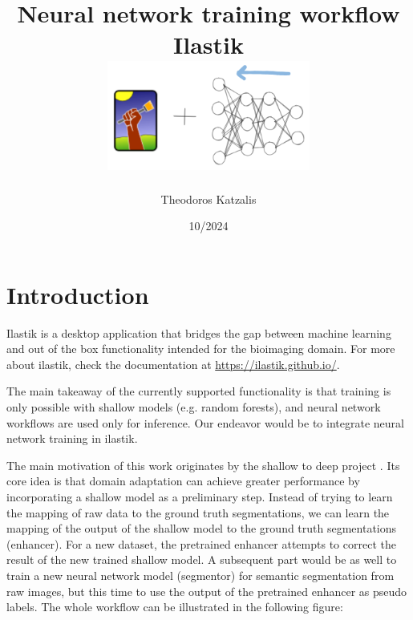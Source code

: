 \documentclass[12pt, a4paper]{article}
\begin{document}
\title{
Neural network training workflow Ilastik\\[1cm]

\includegraphics[width=0.5\textwidth]{ilastik-logo.png}
}

\author{Theodoros Katzalis}


\date{10/2024}


\sloppy
\maketitle

{
\hypersetup{linkcolor=black}
\tableofcontents
}

\clearpage

\section{Introduction}

Ilastik is a desktop application that bridges the gap between machine learning and out of the box functionality intended for the bioimaging domain. For more about ilastik, check the documentation at \url{https://ilastik.github.io/}.

The main takeaway of the currently supported functionality is that training is only possible with shallow models (e.g. random forests), and neural network workflows are used only for inference. Our endeavor would be to integrate neural network training in ilastik.

The main motivation of this work originates by the shallow to deep project \cite{Matskevych2021.11.09.467925}. Its core idea is that domain adaptation can achieve greater performance by incorporating a shallow model as a preliminary step. Instead of trying to learn the mapping of raw data to the ground truth segmentations, we can learn the mapping of the output of the shallow model to the ground truth segmentations (enhancer). For a new dataset, the pretrained enhancer attempts to correct the result of the new trained shallow model. A subsequent part would be as well to train a new neural network model (segmentor) for semantic segmentation from raw images, but this time to use the output of the pretrained enhancer as pseudo labels. The whole workflow can be illustrated in the following figure:
\end{document}
